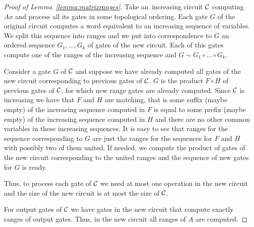\documentclass[11pt,letterpaper]{article}
\begin{document}
\begin{proof}[Proof of Lemma~\ref{lemma:matrixranges}]
Take an~increasing circuit ${\cal C}$ computing $Ax$ and process all its gates in some topological ordering. Each gate $G$ of the original circuit computes a word equivalent to an increasing sequence of variables. We split this sequence into ranges and we put into correspondence to $G$ an ordered sequence $G_1,\ldots, G_k$ of gates of the new circuit. Each of this gates compute one of the ranges of the increasing sequence and $G \sim G_1\circ\ldots \circ G_k$.

Consider a gate $G$ of ${\cal C}$ and suppose we have already computed all gates of the new circuit corresponding to previous gates of ${\cal C}$. $G$ is the product $F \circ H$ of previous gates of ${\cal C}$, for which new range gates are already computed. Since ${\cal C}$ is increasing we have that $F$ and $H$ are matching, that is some suffix (maybe empty) of the increasing sequence computed in $F$ is equal to some prefix (maybe empty) of the increasing sequence computed in $H$ and there are no other common variables in these increasing sequences. It is easy to see that ranges for the sequence corresponding to $G$ are just the ranges for the sequences for $F$ and $H$ with possibly two of them united. If needed, we compute the product of gates of the new circuit corresponding to the united ranges and the sequence of new gates for $G$ is ready.

Thus, to process each gate of ${\cal C}$ we need at most one operation in the new circuit and the size of the new circuit is at most the size of ${\cal C}$.

For output gates of ${\cal C}$ we have gates in the new circuit that compute exactly ranges of output gates. Thus, in the new circuit all ranges of $A$ are computed.
\end{proof}





\end{document}
